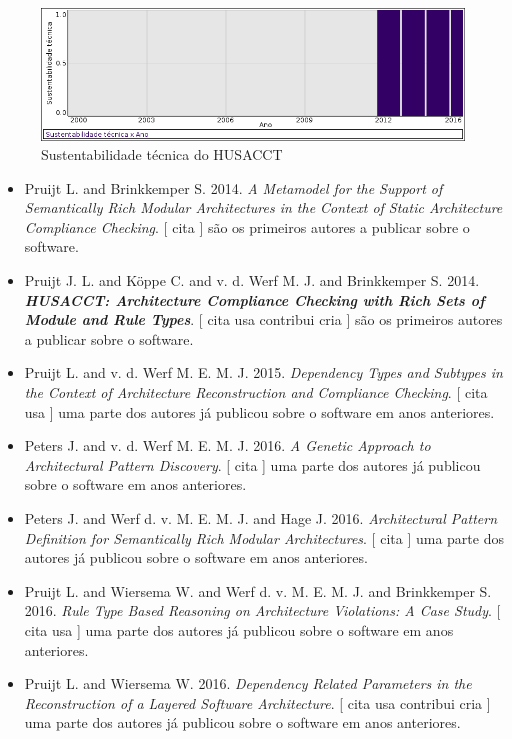 \begin{figure}[h]
  \center
  \includegraphics[scale=0.50]{imagens/softwares-charts/husacct.png}
  \caption{Sustentabilidade técnica do HUSACCT}
\end{figure}


\begin{itemize}
\item Pruijt L. and Brinkkemper S.
      2014.
        \textit{ A Metamodel for the Support of Semantically Rich Modular Architectures in the Context of Static Architecture Compliance Checking}.
      [
          cita
      ]
são os primeiros autores a publicar sobre o software.
\item Pruijt J. L. and K\"{o}ppe C. and v. d. Werf M. J. and Brinkkemper S.
      2014.
        \textbf{\textit{ HUSACCT: Architecture Compliance Checking with Rich Sets of Module and Rule Types}}.
      [
          cita
          usa
          contribui
          cria
      ]
são os primeiros autores a publicar sobre o software.
\item Pruijt L. and v. d. Werf M. E. M. J.
      2015.
        \textit{ Dependency Types and Subtypes in the Context of Architecture Reconstruction and Compliance Checking}.
      [
          cita
          usa
      ]
uma parte dos autores já publicou sobre o software em anos anteriores.
\item Peters J. and v. d. Werf M. E. M. J.
      2016.
        \textit{ A Genetic Approach to Architectural Pattern Discovery}.
      [
          cita
      ]
uma parte dos autores já publicou sobre o software em anos anteriores.
\item Peters J. and Werf d. v. M. E. M. J. and Hage J.
      2016.
        \textit{ Architectural Pattern Definition for Semantically Rich Modular Architectures}.
      [
          cita
      ]
uma parte dos autores já publicou sobre o software em anos anteriores.
\item Pruijt L. and Wiersema W. and Werf d. v. M. E. M. J. and Brinkkemper S.
      2016.
        \textit{ Rule Type Based Reasoning on Architecture Violations: A Case Study}.
      [
          cita
          usa
      ]
uma parte dos autores já publicou sobre o software em anos anteriores.
\item Pruijt L. and Wiersema W.
      2016.
        \textit{ Dependency Related Parameters in the Reconstruction of a Layered Software Architecture}.
      [
          cita
          usa
          contribui
          cria
      ]
uma parte dos autores já publicou sobre o software em anos anteriores.
\end{itemize}
